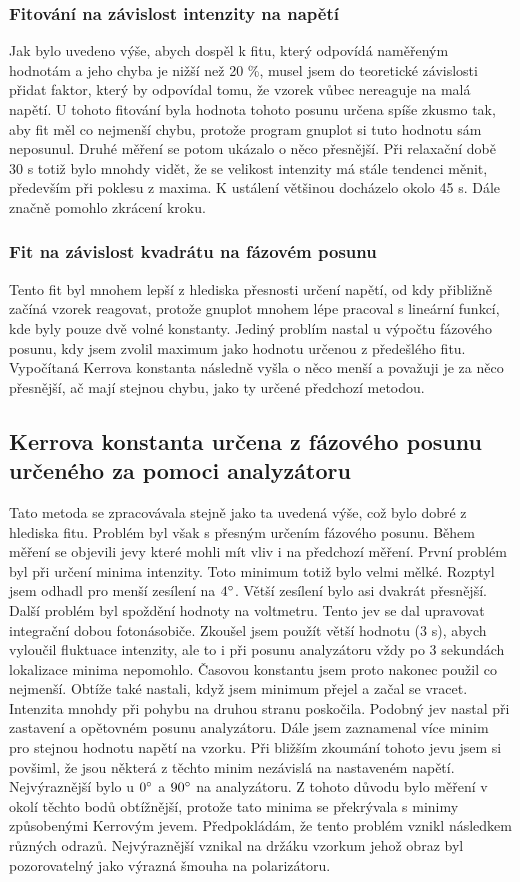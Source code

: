 \documentclass[a4paper,12pt]{article}
\begin{document}
\subsubsection{Fitování na závislost intenzity na napětí}
Jak bylo uvedeno výše, abych dospěl k fitu, který odpovídá naměřeným hodnotám a jeho chyba je nižší než 20 \%, musel jsem do teoretické závislosti přidat faktor, 
který by odpovídal tomu, že vzorek vůbec nereaguje na malá napětí. U tohoto fitování byla hodnota tohoto posunu určena spíše zkusmo tak, aby fit měl co nejmenší chybu, 
protože program gnuplot si tuto hodnotu sám neposunul. Druhé měření se potom ukázalo o něco přesnější. Při relaxační době 30 s totiž bylo mnohdy vidět, že 
se velikost intenzity má stále tendenci měnit, především při poklesu z maxima. K ustálení většinou docházelo okolo 45 s. Dále značně pomohlo zkrácení kroku.

\subsubsection{Fit na závislost kvadrátu na fázovém posunu}
Tento fit byl mnohem lepší z hlediska přesnosti určení napětí, od kdy přibližně začíná vzorek reagovat, protože gnuplot mnohem lépe pracoval s lineární funkcí, kde 
byly pouze dvě volné konstanty. Jediný problím nastal u výpočtu fázového posunu, kdy jsem zvolil maximum jako hodnotu určenou z předešlého fitu. Vypočítaná Kerrova 
konstanta následně vyšla o něco menší a považuji je za něco přesnější, ač mají stejnou chybu, jako ty určené předchozí metodou.

\subsection{Kerrova konstanta určena z fázového posunu určeného za pomoci analyzátoru}
Tato metoda se zpracovávala stejně jako ta uvedená výše, což bylo dobré z hlediska fitu. Problém byl však s přesným určením fázového posunu. Během měření se 
objevili jevy které mohli mít vliv i na předchozí měření. První problém byl při určení minima intenzity. Toto minimum totiž bylo velmi mělké. Rozptyl jsem odhadl 
pro menší zesílení na $4^{\circ}$. Větší zesílení bylo asi dvakrát přesnější. Další problém byl spoždění hodnoty na voltmetru. Tento jev se dal upravovat integrační 
dobou fotonásobiče. Zkoušel jsem použít větší hodnotu (3 s), abych vyloučil fluktuace intenzity, ale to i při posunu analyzátoru vždy po 3 sekundách lokalizace 
minima nepomohlo. Časovou konstantu jsem proto nakonec použil co nejmenší. Obtíže také nastali, když jsem minimum přejel a začal se vracet. Intenzita mnohdy při 
pohybu na druhou stranu poskočila. Podobný jev nastal při zastavení a opětovném posunu analyzátoru. Dále jsem zaznamenal více minim pro stejnou hodnotu napětí na 
vzorku. Při bližším zkoumání tohoto jevu jsem si povšiml, že jsou některá z těchto minim nezávislá na nastaveném napětí. Nejvýraznější bylo u $0^{\circ}$ a $90^{\circ}$ na analyzátoru. 
Z tohoto důvodu bylo měření v okolí těchto bodů obtížnější, protože tato minima se překrývala s minimy způsobenými Kerrovým jevem. Předpokládám, že tento problém 
vznikl následkem různých odrazů. Nejvýraznější vznikal na držáku vzorkum jehož obraz byl pozorovatelný jako výrazná šmouha na polarizátoru.
\end{document}
